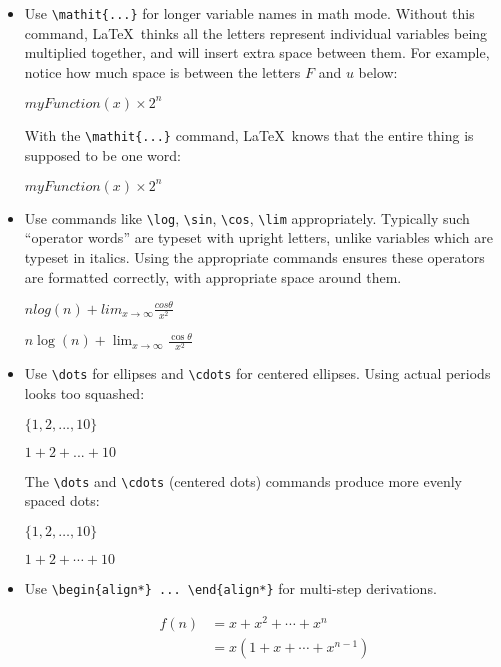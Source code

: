 \documentclass{article}
\begin{document}
\begin{itemize}
\item Use \verb|\mathit{...}| for longer variable names in math mode.
  Without this command, \LaTeX\ thinks all the letters represent
  individual variables being multiplied together, and will insert
  extra space between them.  For example, notice how much space is
  between the letters $F$ and $u$ below:
  \begin{bad}
$myFunction(x) \times 2^n$
  \end{bad}
  With the \verb|\mathit{...}| command, \LaTeX\ knows that the entire
  thing is supposed to be one word:
  \begin{good}
$\mathit{myFunction}(x) \times 2^n$
  \end{good}
\item Use commands like \verb|\log|, \verb|\sin|, \verb|\cos|,
  \verb|\lim| appropriately.  Typically such ``operator words'' are
  typeset with upright letters, unlike variables which
  are typeset in italics.  Using the appropriate commands ensures
  these operators are formatted correctly, with appropriate space
  around them.
  \begin{bad}
$n log(n) + lim_{x \to \infty} \frac{cos \theta}{x^2}$
  \end{bad}
  \begin{good}
$n \log(n) + \lim_{x \to \infty} \frac{\cos \theta}{x^2}$
  \end{good}
\item Use \verb|\dots| for ellipses and \verb|\cdots| for centered
  ellipses. Using actual periods looks too squashed:
  \begin{bad}
$\{1, 2, ..., 10\}$
  \end{bad}
  \begin{bad}
$1 + 2 + ... + 10$
  \end{bad}
  The \verb|\dots| and \verb|\cdots| (centered dots) commands produce
  more evenly spaced dots:
  \begin{good}
$\{1, 2, \dots, 10\}$
  \end{good}
  \begin{good}
$1 + 2 + \cdots + 10$
  \end{good}
\item Use \verb|\begin{align*} ... \end{align*}| for multi-step
  derivations.
  \begin{good}
\begin{align*}
f(n) &= x + x^2 + \cdots + x^n \\
     &= x(1 + x + \cdots + x^{n-1}) \\

\end{align*}
\end{good}
\end{itemize}
\end{document}
